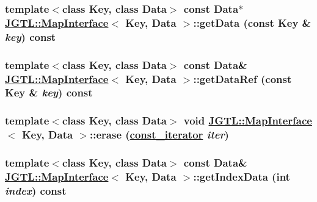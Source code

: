 \hypertarget{class_j_g_t_l_1_1_map_interface_266cbd67bcff93d17649c35254d18190}{
\subsubsection[getData]{\setlength{\rightskip}{0pt plus 5cm}template$<$class Key, class Data$>$ const Data$\ast$ \hyperlink{class_j_g_t_l_1_1_map_interface}{JGTL::Map\-Interface}$<$ Key, Data $>$::get\-Data (const Key \& {\em key}) const}}
\label{class_j_g_t_l_1_1_map_interface_266cbd67bcff93d17649c35254d18190}


\hypertarget{class_j_g_t_l_1_1_map_interface_3613d63a8096f923e4e220e5aa002403}{
\subsubsection[getDataRef]{\setlength{\rightskip}{0pt plus 5cm}template$<$class Key, class Data$>$ const Data\& \hyperlink{class_j_g_t_l_1_1_map_interface}{JGTL::Map\-Interface}$<$ Key, Data $>$::get\-Data\-Ref (const Key \& {\em key}) const}}
\label{class_j_g_t_l_1_1_map_interface_3613d63a8096f923e4e220e5aa002403}


\hypertarget{class_j_g_t_l_1_1_map_interface_7fe23525fa2fca5e47cb047332fb49d3}{
\subsubsection[erase]{\setlength{\rightskip}{0pt plus 5cm}template$<$class Key, class Data$>$ void \hyperlink{class_j_g_t_l_1_1_map_interface}{JGTL::Map\-Interface}$<$ Key, Data $>$::erase (\hyperlink{class_j_g_t_l_1_1_map_interface_bbce6cc516069a5a504e0ae5b9aecd88}{const\_\-iterator} {\em iter})}}
\label{class_j_g_t_l_1_1_map_interface_7fe23525fa2fca5e47cb047332fb49d3}


\hypertarget{class_j_g_t_l_1_1_map_interface_3bd1eca8bba2b057e09eb6579e26ad8f}{
\subsubsection[getIndexData]{\setlength{\rightskip}{0pt plus 5cm}template$<$class Key, class Data$>$ const Data\& \hyperlink{class_j_g_t_l_1_1_map_interface}{JGTL::Map\-Interface}$<$ Key, Data $>$::get\-Index\-Data (int {\em index}) const}}
\label{class_j_g_t_l_1_1_map_interface_3bd1eca8bba2b057e09eb6579e26ad8f}


